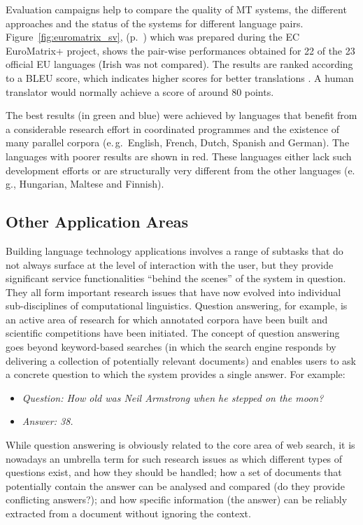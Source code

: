 \begin{multicols}{2}
Evaluation campaigns help to compare the quality of MT systems, the
different approaches and the status of the systems for different
language pairs. Figure~\ref{fig:euromatrix_sv}, (p.~\pageref{fig:euromatrix_sv})
which was prepared during the EC
EuroMatrix+ project, shows the pair-wise performances obtained for
22 of the 23 official EU languages (Irish was not compared). The
results are ranked according to a BLEU score, which indicates higher
scores for better translations \cite{bleu1}. A human translator would
normally achieve a score of around 80 points.

The best results (in green and blue) were achieved by languages that
benefit from a considerable research effort in coordinated programmes
and the existence of many parallel corpora (e.\,g.~English, French,
Dutch, Spanish and German). The languages with poorer results are
shown in red. These languages either lack such development efforts or
are structurally very different from the other languages (e.\,g.,
Hungarian, Maltese and Finnish).

\subsection{Other Application Areas}

Building language technology applications involves a range of subtasks that do not always surface at the level of interaction with the user, but they provide significant service functionalities “behind the scenes” of the system in question. They all form important research issues that have now evolved into individual sub-disciplines of computational linguistics.  Question answering, for example, is an active area of research for which annotated corpora have been built and scientific competitions have been initiated. The concept of question answering goes beyond keyword-based searches (in which the search engine responds by delivering a collection of potentially relevant documents) and enables users to ask a concrete question to which the system provides a single answer. For example:

\begin{itemize}
\item[] \textit{Question: How old was Neil Armstrong when he stepped on the moon?}
\item[] \textit{Answer: 38.}
\end{itemize}

While question answering is obviously related to the core area of web
search, it is nowadays an umbrella term for such research issues as which different types of questions exist, and how they should be handled; how a set of documents that potentially contain the answer can be analysed and compared (do they provide conflicting answers?); and how specific information (the answer) can be reliably extracted from a document without ignoring the context. 


\end{multicols}
